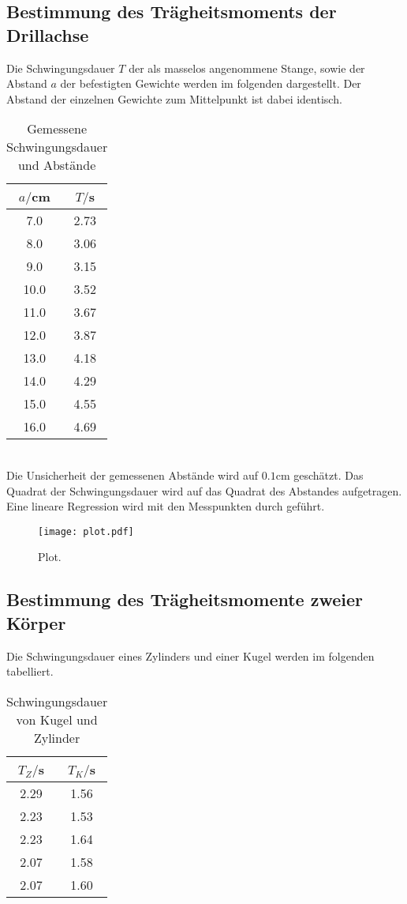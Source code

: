\subsection{Bestimmung des Trägheitsmoments der Drillachse}
Die Schwingungsdauer $T$ der als masselos angenommene Stange, sowie der Abstand $a$
der befestigten Gewichte werden im folgenden dargestellt. Der Abstand der einzelnen
Gewichte zum Mittelpunkt ist dabei identisch.
\begin{table}
  \centering
  \caption{Gemessene Schwingungsdauer und Abstände}
  \label{tab:Gemessene Schwingungsdauer und Abstände}
  \begin{tabular}{c c}
    \toprule
    $a/$cm & $T/$s \\
    \midrule
     7.0 & 2.73 \\
     8.0 & 3.06 \\
     9.0 & 3.15 \\
    10.0 & 3.52 \\
    11.0 & 3.67 \\
    12.0 & 3.87 \\
    13.0 & 4.18 \\
    14.0 & 4.29 \\
    15.0 & 4.55 \\
    16.0 & 4.69 \\
    \bottomrule
  \end{tabular}
\end{table} \\

Die Unsicherheit der gemessenen Abstände wird auf $0.1$cm geschätzt.
Das Quadrat der Schwingungsdauer wird auf das Quadrat des Abstandes
aufgetragen. Eine lineare Regression wird mit den Messpunkten durch geführt.

\begin{figure}
  \centering
  \texttt{[image: plot.pdf]}
  \caption{Plot.}
  \label{fig:plot}
\end{figure}


\subsection{Bestimmung des Trägheitsmomente zweier Körper}
Die Schwingungsdauer eines Zylinders und einer Kugel werden im folgenden tabelliert.
\begin{table}
  \centering
  \caption{Schwingungsdauer von Kugel und Zylinder}
  \label{tab:Schwingungsdauer von Kugel und Zylinder}
  \begin{tabular}{c c}
    \toprule
    $T_Z/$s & $T_K/$s \\
    \midrule
    2.29 & 1.56 \\
    2.23 & 1.53 \\
    2.23 & 1.64 \\
    2.07 & 1.58 \\
    2.07 & 1.60 \\
    \bottomrule
  \end{tabular}
\end{table} \\
